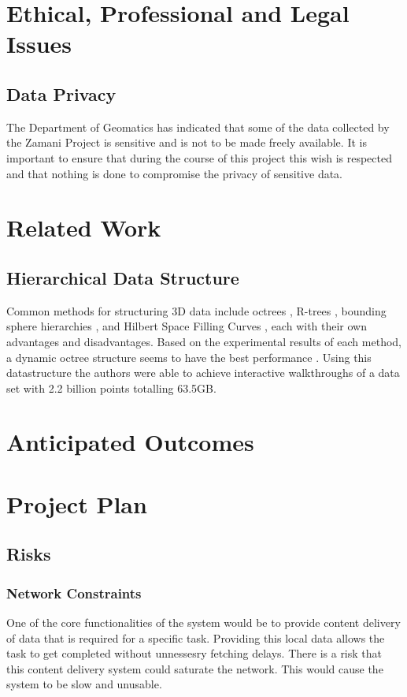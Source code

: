 \documentclass[12pt,a4paper]{article}
\begin{document}
\section{Ethical, Professional and Legal Issues}
\subsection{Data Privacy}
The Department of Geomatics has indicated that some of the data collected by the Zamani Project is sensitive and is not to be made freely available. It is important to ensure that during the course of this project this wish is respected and that nothing is done to compromise the privacy of sensitive data.

\section{Related Work}
\subsection{Hierarchical Data Structure}
Common methods for structuring 3D data include octrees \cite{interactivepointclouds}, R-trees \cite{rtree}, bounding sphere hierarchies \cite{qsplat}, and Hilbert Space Filling Curves \cite{hilbert}, each with their own advantages and disadvantages. Based on the experimental results of each method, a dynamic octree structure seems to have the best performance \cite{interactivepointclouds}. Using this datastructure the authors were able to achieve interactive walkthroughs of a data set with 2.2 billion points totalling 63.5GB.

\section{Anticipated Outcomes}

\section{Project Plan}
\subsection{Risks}
\subsubsection*{Network Constraints}
One of the core functionalities of the system would be to provide
content delivery of data that is required for a specific task. Providing
this local data allows the task to get completed without unnessesry
fetching delays. There is a risk that this content delivery system
could saturate the network. This would cause the system to be slow
and unusable.
\end{document}
